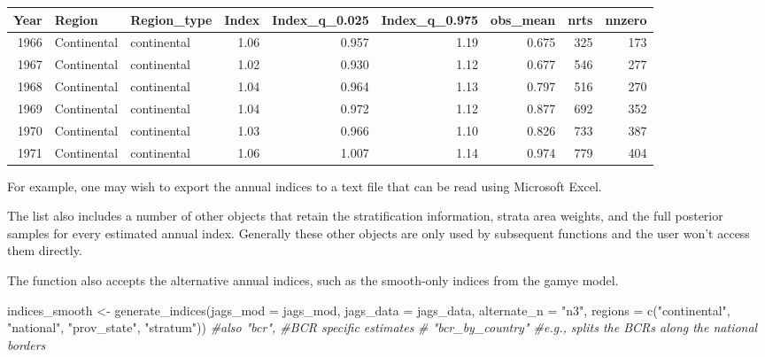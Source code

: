 \documentclass[
]{book}
\newenvironment{Shaded}{\begin{snugshade}}{\end{snugshade}}
\newcommand{\AttributeTok}[1]{\textcolor[rgb]{0.77,0.63,0.00}{#1}}
\newcommand{\CommentTok}[1]{\textcolor[rgb]{0.56,0.35,0.01}{\textit{#1}}}
\newcommand{\FunctionTok}[1]{\textcolor[rgb]{0.00,0.00,0.00}{#1}}
\newcommand{\NormalTok}[1]{#1}
\newcommand{\OtherTok}[1]{\textcolor[rgb]{0.56,0.35,0.01}{#1}}
\newcommand{\SpecialCharTok}[1]{\textcolor[rgb]{0.00,0.00,0.00}{#1}}
\newcommand{\StringTok}[1]{\textcolor[rgb]{0.31,0.60,0.02}{#1}}
\begin{document}
\begin{tabular}{r|l|l|r|r|r|r|r|r}
\hline
Year & Region & Region\_type & Index & Index\_q\_0.025 & Index\_q\_0.975 & obs\_mean & nrts & nnzero\\
\hline
1966 & Continental & continental & 1.06 & 0.957 & 1.19 & 0.675 & 325 & 173\\
\hline
1967 & Continental & continental & 1.02 & 0.930 & 1.12 & 0.677 & 546 & 277\\
\hline
1968 & Continental & continental & 1.04 & 0.964 & 1.13 & 0.797 & 516 & 270\\
\hline
1969 & Continental & continental & 1.04 & 0.972 & 1.12 & 0.877 & 692 & 352\\
\hline
1970 & Continental & continental & 1.03 & 0.966 & 1.10 & 0.826 & 733 & 387\\
\hline
1971 & Continental & continental & 1.06 & 1.007 & 1.14 & 0.974 & 779 & 404\\
\hline
\end{tabular}

For example, one may wish to export the annual indices to a text file that can be read using Microsoft Excel.

\begin{Shaded}
\end{Shaded}

The list also includes a number of other objects that retain the stratification information, strata area weights, and the full posterior samples for every estimated annual index. Generally these other objects are only used by subsequent functions and the user won't access them directly.

The function also accepts the alternative annual indices, such as the smooth-only indices from the gamye model.

\begin{Shaded}
\begin{Highlighting}[]
\NormalTok{indices\_smooth }\OtherTok{\textless{}{-}} \FunctionTok{generate\_indices}\NormalTok{(}\AttributeTok{jags\_mod =}\NormalTok{ jags\_mod,}
                            \AttributeTok{jags\_data =}\NormalTok{ jags\_data,}
                            \AttributeTok{alternate\_n =} \StringTok{"n3"}\NormalTok{,}
                            \AttributeTok{regions =} \FunctionTok{c}\NormalTok{(}\StringTok{"continental"}\NormalTok{,}
                            \StringTok{"national"}\NormalTok{,}
                            \StringTok{"prov\_state"}\NormalTok{,}
                            \StringTok{"stratum"}\NormalTok{))}
                            \CommentTok{\#also "bcr", \#BCR specific estimates}
                            \CommentTok{\# "bcr\_by\_country" \#e.g., splits the BCRs along the national borders}
\end{Highlighting}
\end{Shaded}
\end{document}
